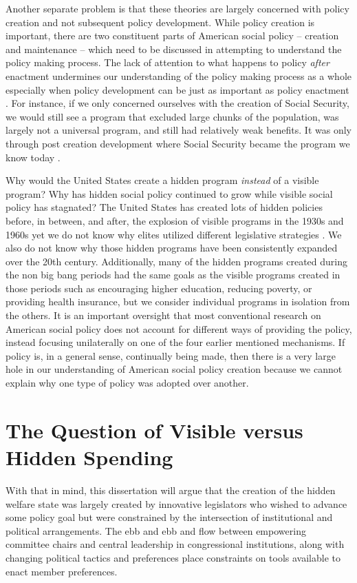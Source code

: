 \documentclass[12pt]{article}
\begin{document}
Another separate problem is that these theories are largely concerned with policy creation and not subsequent policy development. While policy creation is important, there are two constituent parts of American social policy -- creation and maintenance -- which need to be discussed in attempting to understand the policy making process. The lack of attention to what happens to policy \emph{after} enactment undermines our understanding of the policy making process as a whole especially when policy development can be just as important as policy enactment \citep{patashnik2008}. For instance, if we only concerned ourselves with the creation of Social Security, we would still see a program that excluded large chunks of the population, was largely not a universal program, and still had relatively weak benefits. It was only through post creation development where Social Security became the program we know today \citep{derthick1979}.

Why would the United States create a hidden program \emph{instead} of a visible program? Why has hidden social policy continued to grow while visible social policy has stagnated? The United States has created lots of hidden policies before, in between, and after, the explosion of visible programs in the 1930s and 1960s yet we do not know why elites utilized different legislative strategies \citep[Ch. 2]{howard2008}. We also do not know why those hidden programs have been consistently expanded over the 20th century. Additionally, many of the hidden programs created during the non big bang periods had the same goals as the visible programs created in those periods such as encouraging higher education, reducing poverty, or providing health insurance, but we consider individual programs in isolation from the others. It is an important oversight that most conventional research on American social policy does not account for different ways of providing the policy, instead focusing unilaterally on one of the four earlier mentioned mechanisms. If policy is, in a general sense, continually being made, then there is a very large hole in our understanding of American social policy creation because we cannot explain why one type of policy was adopted over another.

\section{The Question of Visible versus Hidden Spending}
With that in mind, this dissertation will argue that the creation of the hidden welfare state was largely created by innovative legislators who wished to advance some policy goal but were constrained by the intersection of institutional and political arrangements. The ebb and ebb and flow between empowering committee chairs and central leadership in congressional institutions, along with changing political tactics and preferences place constraints on tools available to enact member preferences.
\end{document}
